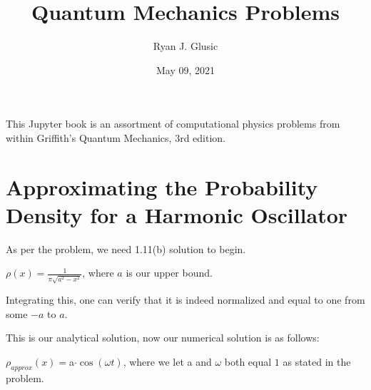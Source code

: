 \documentclass[letterpaper,10pt,english]{jupyterBook}
\title{Quantum Mechanics Problems}
\date{May 09, 2021}
\author{Ryan J.\@{} Glusic}
\begin{document}
\pagestyle{empty}
\sphinxmaketitle
\pagestyle{plain}
\sphinxtableofcontents
\pagestyle{normal}
\label{\detokenize{title-page::doc}}


\sphinxAtStartPar
This Jupyter book is an assortment of computational physics problems from within Griffith’s Quantum Mechanics, 3rd edition.


\chapter{Approximating the Probability Density for a Harmonic Oscillator}
\label{\detokenize{1.13:approximating-the-probability-density-for-a-harmonic-oscillator}}\label{\detokenize{1.13::doc}}
\sphinxAtStartPar
As per the problem, we need 1.11(b) solution to begin.

\sphinxAtStartPar
\(\rho(x)=\frac{1}{\pi\sqrt{a^2-x^2}}\), where \(a\) is our upper bound.

\sphinxAtStartPar
Integrating this, one can verify that it is indeed normalized and equal to one from some \(-a\) to \(a\).

\sphinxAtStartPar
This is our analytical solution, now our numerical solution is as follows:

\sphinxAtStartPar
\(\rho_{approx}(x)=\)a\(\cdot\cos(\omega t)\), where we let a and \(\omega\) both equal \(1\) as stated in the problem.

\begin{sphinxVerbatim}[commandchars=\\\{\}]
   
   

  
  

    
  
  
\end{sphinxVerbatim}
\end{document}
